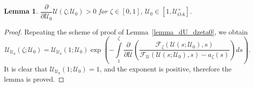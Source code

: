 \documentclass[12pt]{article}
\newtheorem{lemma}{Lemma}
\theoremstyle{definition}
\begin{document}
\begin{lemma}
\label{lemma_U_derivative_by_U_0}
$\dfrac{\partial}{\partial \mathcal U_0}\mathcal U(\zeta; \mathcal U_0) > 0$ for $\zeta\in[0,1]$, $\mathcal U_0\in[1, \mathcal U^+_{OA}]$.
\end{lemma}
\begin{proof}
Repeating the scheme of proof of Lemma~\ref{lemma_dU_dzeta0}, we obtain
\begin{equation*}
    \mathcal U_{\mathcal U_0}(\zeta; \mathcal U_0) = \mathcal U_{\mathcal U_0}(1; \mathcal U_0) \exp\left(-\int\limits_{1}^\zeta \frac{\partial}{\partial\mathcal U}\left(\dfrac{\mathcal F_{\zeta}(\mathcal U(s; \mathcal U_0), s)}{\mathcal F_{\mathcal U}(\mathcal U(s; \mathcal U_0), s) - a_\zeta(s)}\right)ds\right).
\end{equation*}
It is clear that $\mathcal U_{\mathcal U_0}(1; \mathcal U_0) = 1$, and the exponent is positive, therefore the lemma is proved.
\end{proof}
\end{document}

